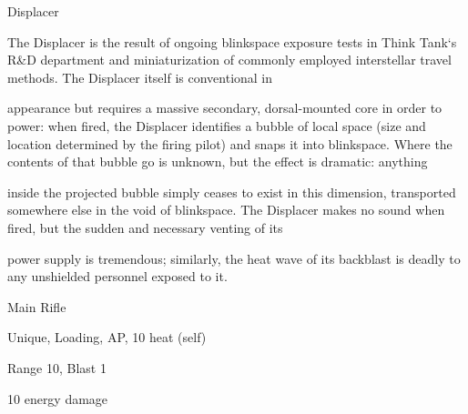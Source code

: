 Displacer  

The Displacer is the result of ongoing blinkspace exposure tests in Think Tank‘s R\&D department and  
miniaturization of commonly employed interstellar travel methods. The Displacer itself is conventional in  

appearance but requires a massive secondary, dorsal-mounted core in order to power: when fired, the  
Displacer identifies a bubble of local space (size and location determined by the firing pilot) and snaps it  
into blinkspace. Where the contents of that bubble go is unknown, but the effect is dramatic: anything  

inside the projected bubble simply ceases to exist in this dimension, transported somewhere else in the  
void of blinkspace. The Displacer makes no sound when fired, but the sudden and necessary venting of its  

                                                                                                                        


power supply is tremendous; similarly, the heat wave of its backblast is deadly to any unshielded personnel  
exposed to it.   

Main Rifle
 
Unique, Loading, AP, 10 heat (self)
 
Range 10, Blast 1
 
10 energy damage
 